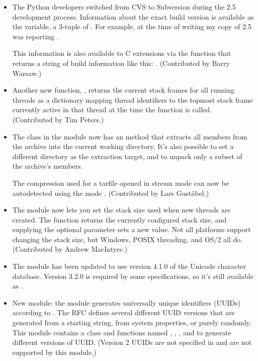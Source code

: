 \documentclass{howto}
\begin{document}
\begin{itemize}
\item The Python developers switched from CVS to Subversion during the 2.5
development process.  Information about the exact build version is
available as the  variable, a 3-tuple of
.  For example, at the time of writing my copy
of 2.5 was reporting .

This information is also available to C extensions via the 
 function that returns a 
string of build information like this:
.  
(Contributed by Barry Warsaw.)

\item Another new function, , returns
the current stack frames for all running threads as a dictionary
mapping thread identifiers to the topmost stack frame currently active
in that thread at the time the function is called.  (Contributed by
Tim Peters.)

\item The  class in the  module now has
an  method that extracts all members from the
archive into the current working directory.  It's also possible to set
a different directory as the extraction target, and to unpack only a
subset of the archive's members.

The compression used for a tarfile opened in stream mode can now be
autodetected using the mode .
(Contributed by Lars Gust\"abel.)

\item The  module now lets you set the stack size
used when new threads are created. The
 function returns the
currently configured stack size, and supplying the optional 
parameter sets a new value.  Not all platforms support changing the
stack size, but Windows, POSIX threading, and OS/2 all do.
(Contributed by Andrew MacIntyre.)

\item The  module has been updated to use version 4.1.0
of the Unicode character database.  Version 3.2.0 is required 
by some specifications, so it's still available as 
.

\item New module: the   module generates 
universally unique identifiers (UUIDs) according to .  The
RFC defines several different UUID versions that are generated from a
starting string, from system properties, or purely randomly.  This
module contains a  class and 
functions named ,
, ,  and 
 to generate different versions of UUID.  (Version 2 UUIDs 
are not specified in  and are not supported by this module.)


\end{itemize}
\end{document}
